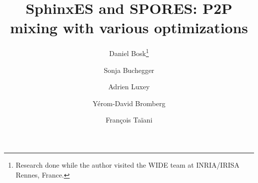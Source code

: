 \documentclass{article}
\begin{document}
\title{%
  SphinxES and \acs*{SPORES}:
  \acs*{P2P} mixing with various optimizations
}

\author[1]{Daniel Bosk\thanks{%
  Research done while the author visited the WIDE team at INRIA/IRISA Rennes, 
  France.
}}
\author[1]{Sonja Buchegger}
\author[2]{Adrien Luxey}
\author[2]{Yérom-David Bromberg}
\author[2]{François Taïani}


\begin{abstract}
  
\end{abstract}


\end{document}
